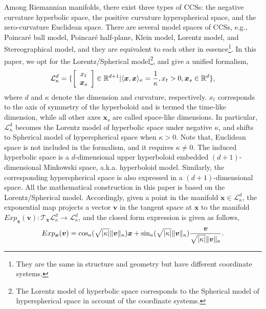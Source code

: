 Among Riemannian manifolds, there exist three types of CCSs: the negative curvature hyperbolic space, the positive curvature hyperspherical space, and the zero-curvature Euclidean space.
There are several model spaces of CCSs, e.g., Poincar\'{e} ball model, Poincar\'{e} half-plane, Klein model, Lorentz model, and Stereographical model, and they are equivalent to each other in essence\footnote{They are the same in structure and geometry but have different coordinate systems.}.
In this paper, we opt for the Lorentz/Spherical model\footnote{The Lorentz model of hyperbolic space corresponds to the Spherical model of hyperspherical space in account of the coordinate systems.}, and give a unified formalism,
\vspace{-0.1in}
\begin{equation}
\mathcal L_{\kappa }^{d}=\{ 
\left[\begin{array}{c}
x_t  \\
\boldsymbol x_s 
\end{array}\right] \in \mathbb R^{d+1} 
| \langle \boldsymbol x, \boldsymbol x \rangle_\kappa = \frac{1}{\kappa}, x_t >0, \boldsymbol x_s \in \mathbb R^d\},
\vspace{-0.02in}
\end{equation}
where  $d$ and $\kappa$ denote the dimension and curvature, respectively.
$x_t$ corresponds to the axis of symmetry of the hyperboloid and is termed the time-like dimension, while all other axes $\boldsymbol x_s$ are called space-like dimensions. 
In particular, $\mathcal L^d_\kappa$ becomes the Lorentz model of hyperbolic space under negative $\kappa$, and shifts to Spherical model of hyperspherical space when $\kappa>0$.
Note that, Euclidean space is not included in the formalism, and it requires $\kappa \neq 0$.
The induced hyperbolic space is a $d$-dimensional upper hyperboloid embedded $(d+1)$-dimensional Minkowski space, a.k.a. hyperboloid model. 
Similarly, the corresponding hyperspherical space is also expressed in a $(d+1)$-dimensional space.
All the mathematical construction in this paper is based on the Lorentz/Spherical model.
Accordingly, 
given a point in the manifold $\boldsymbol x \in \mathcal L_{\kappa }^{d}$, the exponential map projects a vector $\boldsymbol  v$ in the tangent space at $\boldsymbol  x$ to the manifold $Exp_{\boldsymbol x}(\boldsymbol v): \mathcal T_{\boldsymbol x}\mathcal L_{\kappa }^{d} \to \mathcal L_{\kappa }^{d}$, and the closed form expression is given as follows,
\vspace{-0.05in}
\begin{equation}
Exp_{\boldsymbol x}(\boldsymbol v) = \cos_{\kappa}(\sqrt{|\kappa|}\|\boldsymbol v\|_\kappa) \boldsymbol x + \sin_\kappa(\sqrt{|\kappa|}\|\boldsymbol v\|_\kappa) \frac{\boldsymbol v}{\sqrt{|\kappa|}\|\boldsymbol v\|_\kappa}. \\
\vspace{-0.03in}
\end{equation}
